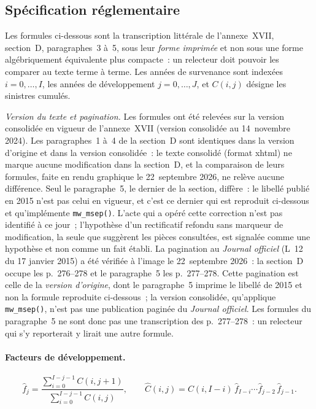 \documentclass[a4paper,11pt]{article}
\newcommand{\code}[1]{\texttt{\small #1}}
\begin{document}
\subsection{Spécification réglementaire}

Les formules ci-dessous sont la transcription littérale de l'annexe~XVII,
section~D, paragraphes~3 à~5, sous leur \emph{forme imprimée} et non sous une
forme algébriquement équivalente plus compacte~: un relecteur doit pouvoir les
comparer au texte terme à terme. Les années de survenance sont indexées
$i = 0,\dots,I$, les années de développement $j = 0,\dots,J$, et $C(i,j)$ désigne
les sinistres cumulés.

\medskip
\noindent
\emph{Version du texte et pagination.} Les formules ont été relevées sur la
version consolidée en vigueur de l'annexe~XVII (version consolidée au
14~novembre 2024). Les paragraphes~1 à~4 de la section~D sont identiques dans
la version d'origine et dans la version consolidée~: le texte consolidé
(format xhtml) ne marque aucune modification dans la section~D, et la comparaison de
leurs formules, faite en rendu graphique le 22~septembre 2026, ne relève aucune
différence. Seul le paragraphe~5, le dernier de la section, diffère~: le
libellé publié en 2015 n'est pas celui en vigueur, et c'est ce dernier qui est
reproduit ci-dessous et qu'implémente \code{mw\_msep()}. L'acte qui a opéré
cette correction n'est pas identifié à ce jour~; l'hypothèse d'un rectificatif
refondu sans marqueur de modification, la seule que suggèrent les pièces
consultées, est signalée comme une hypothèse et non comme un fait établi. La
pagination au \emph{Journal officiel} (L~12 du 17 janvier 2015) a été vérifiée
à l'image le 22~septembre 2026~: la section~D occupe les p.~276--278 et le
paragraphe~5 les p.~277--278. Cette pagination est celle de la \emph{version
d'origine}, dont le paragraphe~5 imprime le libellé de 2015 et non la formule
reproduite ci-dessous~; la version consolidée, qu'applique \code{mw\_msep()},
n'est pas une publication paginée du \emph{Journal officiel}. Les formules du
paragraphe~5 ne sont donc pas une transcription des p.~277--278~: un relecteur
qui s'y reporterait y lirait une autre formule.

\paragraph{Facteurs de développement.}
\[
  \hat f_j = \frac{\sum_{i=0}^{I-j-1} C(i,j+1)}{\sum_{i=0}^{I-j-1} C(i,j)},
  \qquad
  \hat C(i,j) = C(i,I-i)\,\hat f_{I-i}\cdots\hat f_{j-2}\,\hat f_{j-1}.
\]
\end{document}
